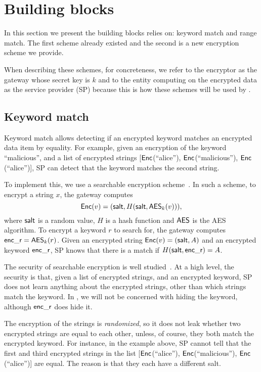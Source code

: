 


\section{Building blocks}

In this section we present the building blocks \sys relies on: keyword match and range match. The first scheme already existed and the second is a new encryption scheme we provide. 

When describing these schemes, for concreteness, we refer to the encryptor as the gateway whose secret key is $k$ and to the entity computing on the encrypted data as the service provider (SP) because this is how these schemes will be used by \sys.


\subsection{Keyword match}


Keyword match allows detecting if an encrypted keyword matches an encrypted data item by equality.
For example, given an encryption of the keyword ``malicious'', and a list of encrypted strings  [$\mathsf{Enc}$(``alice''), $\mathsf{Enc}$(``malicious''), $\mathsf{Enc}$(``alice'')], SP can  detect that the keyword matches the second string. 

To implement this, we use a searchable encryption scheme~\cite{song:search, blindbox}.
In such a scheme, 
to encrypt a string $x$, the gateway computes 
\begin{equation}
\mathsf{Enc}(v) = (\mathsf{salt}, H(\mathsf{salt}, \mathsf{AES}_k(v))), \label{eq:KWMatchEnc}
\end{equation}
where $\mathsf{salt}$ is a random value, $H$ is a hash function and $\mathsf{AES}$ is the AES algorithm.
To encrypt a keyword $r$ to search for, the gateway computes $\mathsf{enc\_r} = \mathsf{AES}_k(r)$. 
Given an encrypted string $\mathsf{Enc}(v) = (\mathsf{salt}, A)$ and an encrypted keyword $\mathsf{enc\_r}$, SP knows that there is a match if  $H(\mathsf{salt}, \mathsf{enc\_r}) = A$.  

 The security of searchable encryption is well studied~\cite{song:search, blindbox}. At a high level, the security is that, given a list of encrypted strings, and an encrypted keyword, SP does not learn anything about the encrypted strings, other than which strings match the keyword. In \sys, we will not be concerned with hiding the keyword, although $\mathsf{enc\_r}$ does hide it. 

 The encryption of the strings is {\em randomized}, so it does not leak whether two encrypted strings are equal to each other, unless, of course, they both match the encrypted keyword. For instance, in the example above, SP cannot tell that the first and third encrypted strings 
in the list [$\mathsf{Enc}$(``alice''), $\mathsf{Enc}$(``malicious''), $\mathsf{Enc}$(``alice'')] are equal. The reason is that they each have a different salt.  


